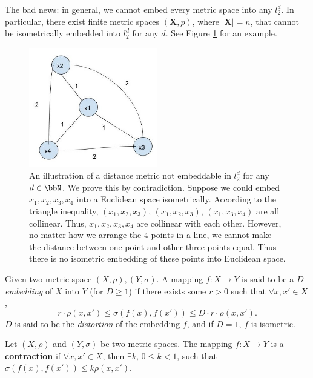 The bad news: in general, we cannot embed every metric space into any $l_2^d$.
In particular, there exist finite metric spaces
$(\mathbf{X},p)$, where $|\mathbf{X}| = n$, that
cannot be isometrically embedded into $l_2^d$ for any $d$.
See Figure \ref{fig:unembeddable} for an example. 

\begin{figure}[h!]
\begin{center}
\includegraphics[width=0.5\textwidth]{chapter_5/files/unembeddable.jpg}
\caption{An illustration of a distance metric not embeddable in $l_2^d$ for any $d \in \bbN$.
We prove this by contradiction. Suppose we could embed $x_1, x_2, x_3, x_4$ into a Euclidean space isometrically.
According to the triangle inequality, $(x_1 ,x_2, x_3)$, $(x_1, x_2, x_3)$, $(x_1, x_3, x_4)$ are all collinear.
Thus, $x_1, x_2, x_3, x_4$ are collinear with each other.
However, no matter how we arrange the 4 points in a line,
we cannot make the distance between one point and other three points equal.
Thus there is no isometric embedding of these points into Euclidean space.}
\label{fig:unembeddable}
\end{center}
\end{figure}

\begin{definition}
Given two metric space $(X,\rho), (Y,\sigma)$. A mapping $f:
X\rightarrow Y$ is said to be a \emph{$D$-embedding} of $X$ into $Y$
(for $D\geq 1$) if there exists some $r>0$ such that $\forall x,x'
\in X$, 
\[
r \cdot \rho(x,x') \leq \sigma(f(x),f(x')) \leq D \cdot r \cdot
\rho(x,x').
\]
$D$ is said to be the \emph{distortion} of the embedding $f$, and if $D=1$, $f$ is isometric. \\
\end{definition}

\begin{definition}
Let $(X,\rho)$ and $(Y,\sigma)$ be two 
metric spaces. The mapping $f: X \rightarrow Y$ is a \textbf{contraction}
if $\forall x,x' \in X$, then $\exists k$, $0 \leq k < 1$, such that 
$\sigma (f(x), f(x')) \leq k \rho (x,x')$.
\end{definition}

